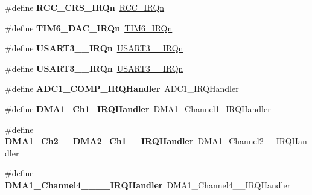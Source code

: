 \begin{DoxyCompactItemize}
\#define {\bfseries R\+C\+C\+\_\+\+C\+R\+S\+\_\+\+I\+R\+Qn}~\hyperlink{group___peripheral__interrupt__number__definition_gga7e1129cd8a196f4284d41db3e82ad5c8a5710b22392997bac63daa5c999730f77}{R\+C\+C\+\_\+\+I\+R\+Qn}
\item 
\mbox{\label{group__stm32f070xb_gad95202b3f62989995dea3404eefece19}} 
\#define {\bfseries T\+I\+M6\+\_\+\+D\+A\+C\+\_\+\+I\+R\+Qn}~\hyperlink{group___peripheral__interrupt__number__definition_gga7e1129cd8a196f4284d41db3e82ad5c8a99bd6662671832371d7c727046b147b2}{T\+I\+M6\+\_\+\+I\+R\+Qn}
\item 
\mbox{\label{group__stm32f070xb_gade0cba0a5aa75d4a35b1a6d41f4b3283}} 
\#define {\bfseries U\+S\+A\+R\+T3\+\_\+\_\+\+I\+R\+Qn}~\hyperlink{group___peripheral__interrupt__number__definition_gga7e1129cd8a196f4284d41db3e82ad5c8add6606f10b425acd45f5b193aaffefdf}{U\+S\+A\+R\+T3\+\_\+\_\+\+I\+R\+Qn}
\item 
\mbox{\label{group__stm32f070xb_gad8e0c20d4c7a475d383e6b992ec23332}} 
\#define {\bfseries U\+S\+A\+R\+T3\+\_\+\_\+\+I\+R\+Qn}~\hyperlink{group___peripheral__interrupt__number__definition_gga7e1129cd8a196f4284d41db3e82ad5c8add6606f10b425acd45f5b193aaffefdf}{U\+S\+A\+R\+T3\+\_\+\_\+\+I\+R\+Qn}
\item 
\mbox{\label{group__stm32f070xb_gaeb3545df015f964b68346cda78f7cea5}} 
\#define {\bfseries A\+D\+C1\+\_\+\+C\+O\+M\+P\+\_\+\+I\+R\+Q\+Handler}~A\+D\+C1\+\_\+\+I\+R\+Q\+Handler
\item 
\mbox{\label{group__stm32f070xb_ga3f7debe9fc2548ab6640825967110101}} 
\#define {\bfseries D\+M\+A1\+\_\+\+Ch1\+\_\+\+I\+R\+Q\+Handler}~D\+M\+A1\+\_\+\+Channel1\+\_\+\+I\+R\+Q\+Handler
\item 
\mbox{\label{group__stm32f070xb_ga3752ab0b9a6635ccd7bc87b99ee8fd9b}} 
\#define {\bfseries D\+M\+A1\+\_\+\+Ch2\+\_\+\_\+\+D\+M\+A2\+\_\+\+Ch1\+\_\+\_\+\+I\+R\+Q\+Handler}~D\+M\+A1\+\_\+\+Channel2\+\_\+\_\+\+I\+R\+Q\+Handler
\item 
\mbox{\label{group__stm32f070xb_gae3db46ad17e9f800e0f88b489eed522d}} 
\#define {\bfseries D\+M\+A1\+\_\+\+Channel4\+\_\+\_\+\_\+\_\+\+I\+R\+Q\+Handler}~D\+M\+A1\+\_\+\+Channel4\+\_\+\_\+\+I\+R\+Q\+Handler

\end{DoxyCompactItemize}
